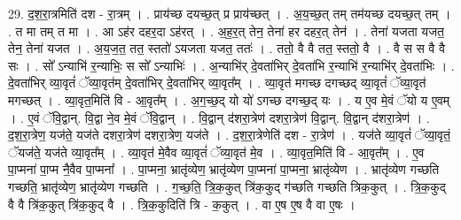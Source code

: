 \documentclass[17pt]{extarticle}
\begin{document}
29. द॒श॒रा॒त्रमिति॑ दश - रा॒त्रम् । . प्राय॑च्छ दयच्छ॒त् प्र प्राय॑च्छत् । . अ॒य॒च्छ॒त् तम् तम॑यच्छ दयच्छ॒त् तम् । . त मा तम् त मा । . आ ऽह॑र दहर॒दा ऽह॑रत् । . अ॒ह॒र॒त् तेन॒ तेना॑ हर दहर॒त् तेन॑ । . तेना॑ यजता यजत॒ तेन॒ तेना॑ यजत । . अ॒य॒ज॒त॒ तत॒ स्ततो॑ ऽयजता यजत॒ ततः॑ । . ततो॒ वै वै तत॒ स्ततो॒ वै । . वै स स वै वै सः । . सो᳚ ऽन्याभि॑ र॒न्याभिः॒ स सो᳚ ऽन्याभिः॑ । . अ॒न्याभि॑र् दे॒वता॑भिर् दे॒वता॑भि र॒न्याभि॑ र॒न्याभि॑र् दे॒वता॑भिः । . दे॒वता॑भिर् व्या॒वृतं॑ ॅव्या॒वृत॑म् दे॒वता॑भिर् दे॒वता॑भिर् व्या॒वृत᳚म् । . व्या॒वृत॑ मगच्छ दगच्छद् व्या॒वृतं॑ ॅव्या॒वृत॑ मगच्छत् । . व्या॒वृत॒मिति॑ वि - आ॒वृत᳚म् । . अ॒ग॒च्छ॒द् यो यो॑ ऽगच्छ दगच्छ॒द् यः । . य ए॒व मे॒वं ॅयो य ए॒वम् । . ए॒वं ॅवि॒द्वान्. वि॒द्वा ने॒व मे॒वं ॅवि॒द्वान् । . वि॒द्वान् द॑शरा॒त्रेण॑ दशरा॒त्रेण॑ वि॒द्वान्. वि॒द्वान् द॑शरा॒त्रेण॑ । . द॒श॒रा॒त्रेण॒ यज॑ते॒ यज॑ते दशरा॒त्रेण॑ दशरा॒त्रेण॒ यज॑ते । . द॒श॒रा॒त्रेणेति॑ दश - रा॒त्रेण॑ । . यज॑ते व्या॒वृतं॑ ॅव्या॒वृतं॒ ॅयज॑ते॒ यज॑ते व्या॒वृत᳚म् । . व्या॒वृत॑ मे॒वैव व्या॒वृतं॑ ॅव्या॒वृत॑ मे॒व । . व्या॒वृत॒मिति॑ वि - आ॒वृत᳚म् । . ए॒व पा॒प्मना॑ पा॒प्म नै॒वैव पा॒प्मना᳚ । . पा॒प्मना॒ भ्रातृ॑व्येण॒ भ्रातृ॑व्येण पा॒प्मना॑ पा॒प्मना॒ भ्रातृ॑व्येण । . भ्रातृ॑व्येण गच्छति गच्छति॒ भ्रातृ॑व्येण॒ भ्रातृ॑व्येण गच्छति । . ग॒च्छ॒ति॒ त्रि॒क॒कुत् त्रि॑क॒कुद् ग॑च्छति गच्छति त्रिक॒कुत् । . त्रि॒क॒कुद् वै वै त्रि॑क॒कुत् त्रि॑क॒कुद् वै । . त्रि॒क॒कुदिति॑ त्रि - क॒कुत् । . वा ए॒ष ए॒ष वै वा ए॒षः । \newline
\end{document}
